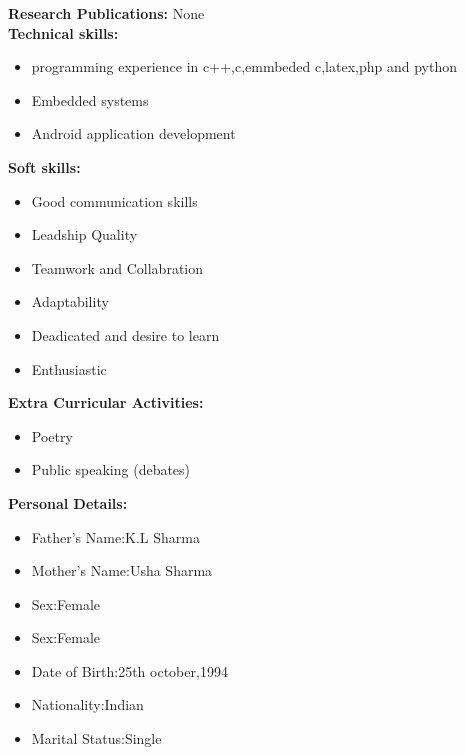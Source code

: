 \documentclass[10pt,a4paper]{article}
\begin{document}
\begin{flushleft}
 
  \textbf{Research Publications:} None\\ \medskip
  \textbf{Technical skills:}\\
   \begin{itemize}
   	\item programming experience in c++,c,emmbeded c,latex,php and python\\
   	\item  Embedded systems\\
   	\item  Android application development\\
    \end{itemize}
     
  \textbf{Soft skills:}\\
    \begin{itemize}
    	\item Good communication skills\\
    	\item Leadship Quality\\
    	\item Teamwork and Collabration\\
    	\item Adaptability\\
    	\item Deadicated and desire to learn\\
    	\item Enthusiastic\\
    	
    \end{itemize}
    
  \newpage
 
  \textbf{Extra Curricular Activities:}\\
  
  \begin{itemize}
  	\item Poetry\\
  	\item Public speaking (debates)\\
  	
  \end{itemize}
   
   
   \textbf{Personal Details:}\\
   
    \begin{itemize}
    	\item Father's Name:K.L Sharma\\
    	\item Mother's Name:Usha Sharma\\
    	\item Sex:Female\\
    	\item Sex:Female\\
    	\item Date of Birth:25th october,1994\\
    	\item Nationality:Indian\\
    	\item Marital Status:Single\\
    \end{itemize}
      

\end{flushleft}
\end{document}

